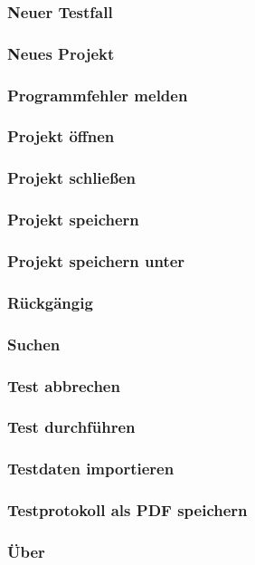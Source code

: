\documentclass[a4paper,10pt]{scrartcl}
\begin{document}
\subsubsection{Neuer Testfall}
\subsubsection{Neues Projekt}
\subsubsection{Programmfehler melden}
\subsubsection{Projekt öffnen}
\subsubsection{Projekt schließen}
\subsubsection{Projekt speichern}
\subsubsection{Projekt speichern unter}
\subsubsection{Rückgängig}
\subsubsection{Suchen}
\subsubsection{Test abbrechen}
\subsubsection{Test durchführen}
\subsubsection{Testdaten importieren}
\subsubsection{Testprotokoll als PDF speichern}
\subsubsection{Über}
\end{document}

